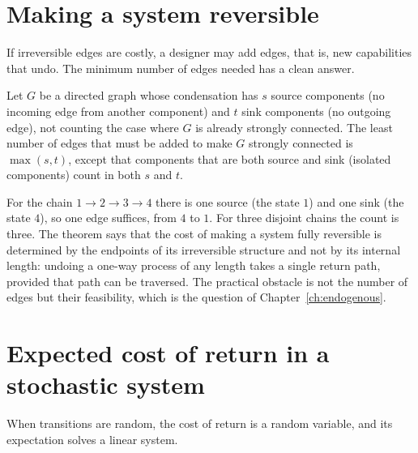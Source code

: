 \section{Making a system reversible}\label{sec:augment-reversible}

If irreversible edges are costly, a designer may add edges, that is, new capabilities that undo. The minimum number of edges needed has a clean answer.

\begin{established}\label{thm:eswaran}
Let $G$ be a directed graph whose condensation has $s$ source components (no incoming edge from another component) and $t$ sink components (no outgoing edge), not counting the case where $G$ is already strongly connected. The least number of edges that must be added to make $G$ strongly connected is $\max(s,t)$, except that components that are both source and sink (isolated components) count in both $s$ and $t$.
\end{established}

For the chain $1\to2\to3\to4$ there is one source (the state $1$) and one sink (the state $4$), so one edge suffices, from $4$ to $1$. For three disjoint chains the count is three. The theorem says that the cost of making a system fully reversible is determined by the endpoints of its irreversible structure and not by its internal length: undoing a one-way process of any length takes a single return path, provided that path can be traversed. The practical obstacle is not the number of edges but their feasibility, which is the question of Chapter~\ref{ch:endogenous}.

\section{Expected cost of return in a stochastic system}\label{sec:expected-return}

When transitions are random, the cost of return is a random variable, and its expectation solves a linear system.

